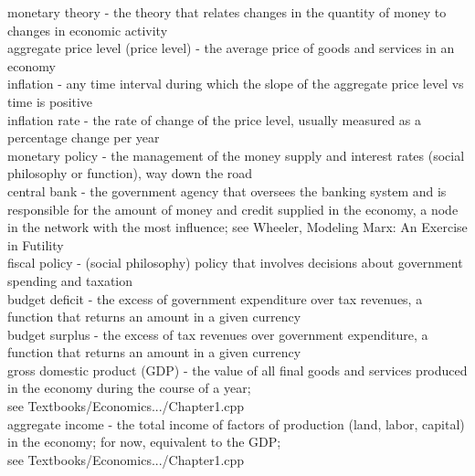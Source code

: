 \documentclass[12pt]{article}
\begin{document}
\noindent monetary theory - the theory that relates changes in the quantity of money to changes in economic activity\\

\noindent aggregate price level (price level) - the average price of goods and services in an economy\\

\noindent inflation - any time interval during which the slope of the aggregate price level vs time is positive\\

\noindent inflation rate - the rate of change of the price level, usually measured as a percentage change per year\\

\noindent monetary policy - the management of the money supply and interest rates (social philosophy or function), way down the road\\

\noindent central bank -  the government agency that oversees the banking system and is responsible for the amount of money and credit supplied in the economy, a node in the network with the most influence; see Wheeler, Modeling Marx: An Exercise in Futility\\

\noindent fiscal policy - (social philosophy) policy that involves decisions about government spending and taxation\\

\noindent budget deficit - the excess of government expenditure over tax revenues, a function that returns an amount in a given currency\\

\noindent budget surplus - the excess of tax revenues over government expenditure, a function that returns an amount in a given currency\\

\noindent gross domestic product (GDP) -  the value of all final goods and services produced in the economy during the course of a year; \\
\noindent see Textbooks/Economics.../Chapter1.cpp\\

\noindent aggregate income - the total income of factors of production (land, labor, capital) in the economy; for now, equivalent to the GDP;\\
\noindent see Textbooks/Economics.../Chapter1.cpp\\
\end{document}
